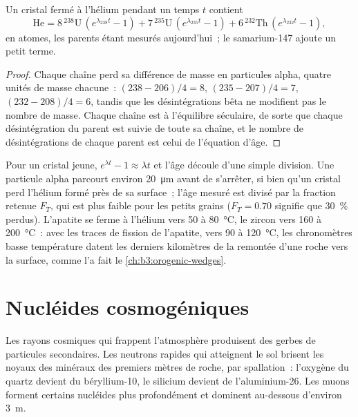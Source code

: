 \begin{theorem}\label{thm:b3:advanced-geochronology:helium}
Un cristal fermé à l'hélium pendant un temps $t$ contient
\[
\mathrm{He} = 8\,{}^{238}\mathrm U\,(e^{\lambda_{238}t} - 1)
+ 7\,{}^{235}\mathrm U\,(e^{\lambda_{235}t} - 1)
+ 6\,{}^{232}\mathrm{Th}\,(e^{\lambda_{232}t} - 1),
\]
en atomes, les parents étant mesurés aujourd'hui~; le samarium-147 ajoute un petit terme.
\end{theorem}

\begin{proof}
Chaque chaîne perd sa différence de masse en particules alpha, quatre unités de masse chacune~:
$(238 - 206)/4 = 8$, $(235 - 207)/4 = 7$, $(232 - 208)/4 = 6$, tandis que les désintégrations bêta
ne modifient pas le nombre de masse. Chaque chaîne est à l'équilibre séculaire,
de sorte que chaque désintégration du parent est suivie de toute sa chaîne, et le nombre de
désintégrations de chaque parent est celui de l'équation d'âge.
\end{proof}

Pour un cristal jeune, $e^{\lambda t} - 1 \approx \lambda t$ et l'âge découle
d'une simple division. Une particule alpha parcourt environ
\qty{20}{\micro\metre} avant de s'arrêter, si bien qu'un cristal perd l'hélium formé
près de sa surface~; l'âge mesuré est divisé par la fraction retenue $F_T$,
qui est plus faible pour les petits grains ($F_T = 0.70$ signifie que \qty{30}{\percent}
perdus). L'apatite se ferme à l'hélium vers 50 à \qty{80}{\celsius}, le zircon vers
160 à \qty{200}{\celsius}~: avec les traces de fission de l'apatite, vers 90 à
\qty{120}{\celsius}, les chronomètres basse température datent les derniers
kilomètres de la remontée d'une roche vers la surface, comme
l'a fait le \cref{ch:b3:orogenic-wedges}.

\section{Nucléides cosmogéniques}\label{sec:b3:advanced-geochronology:cosmogenic}

Les rayons cosmiques qui frappent l'atmosphère produisent des gerbes de particules secondaires. Les
neutrons rapides qui atteignent le sol brisent les noyaux des minéraux des premiers
mètres de roche, par spallation~: l'oxygène du quartz devient du béryllium-10, le silicium
devient de l'aluminium-26. Les muons forment certains nucléides plus profondément et dominent au-dessous d'environ
\qty{3}{m}.

